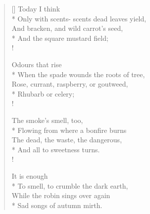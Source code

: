 \documentclass[MAIN]{subfiles}
\begin{document}
\settowidth{\versewidth}{Only with scents- scents dead leaves yield,}
\begin{verse}[\versewidth]
\vin Today I think\\* 
Only with scents- scents dead leaves yield,\\
\vin And bracken, and wild carrot's seed,\\*
And the square mustard field;\\!

\vin Odours that rise\\*
When the spade wounds the roots of tree,\\
\vin Rose, currant, raspberry, or goutweed,\\*
Rhubarb or celery;\\!

\vin The smoke's smell, too,\\*
Flowing from where a bonfire burns\\
\vin The dead, the waste, the dangerous,\\*
And all to sweetness turns.\\!

\vin It is enough\\*
To smell, to crumble the dark earth,\\
\vin While the robin sings over again\\*
Sad songs of autumn mirth.
\end{verse}
\end{document}
